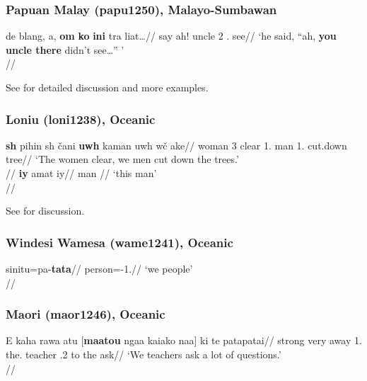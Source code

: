 \documentclass[A4paper]{article}
\begin{document}
\subsubsection{Papuan Malay (papu1250), Malayo-Sumbawan}

\ex
\begingl
\gla de blang, a, \textbf{om} \textbf{ko} \textbf{ini} tra liat\ldots//
\Sg{} say ah! uncle 2\Sg{} \Dem.\Prox{} \Neg{} see//
\glft `he said, ``ah, \textbf{you uncle there} didn't see\ldots'' '\\\citep[353, (66)]{kluge2017}//
\endgl
\xe

See \citet[ch. 6.2]{kluge2017} for detailed discussion and more examples.

\subsubsection{Loniu (loni1238), Oceanic}
	

\pex
\a \begingl
\gla \textbf{s\textepsilon{}h} pihin s\textepsilon{}h \v{c}ani \textbf{uw\textepsilon{}h} kaman uw\textepsilon{}h w\textepsilon{}\v{c}\textepsilon{} ake//
\Pl{} woman 3\Pl{} clear 1\Pl.\Excl{} man 1\Pl.\Excl{} cut.down tree//
\glft `The women clear, we men cut down the trees.'\\\citep[90, (6)]{hamel1994}//
\endgl
\a 
\begingl
\gla \textbf{iy} amat iy\textopeno{}//
\Sg{} man \Dem//
\glft `this man'\\\citep[100, (89)]{hamel1994}//
\endgl
\xe

See \citet[sec. 4.2.1]{hamel1994} for discussion.

\subsubsection{Windesi Wamesa (wame1241), Oceanic}

\ex
\begingl
\gla sinitu=pa-\textbf{tata}//
\glb person=\Det{}-1\Pl{}.\Incl{}//
\glft `we people' \\{\citep[144, (3.46)]{gasser2014}}//
\endgl
\xe

\subsubsection{Maori (maor1246), Oceanic}

\ex 
\begingl
\gla E kaha rawa atu [\textbf{maatou} ngaa  kaiako naa] ki te pata\textperiodcentered{}patai//
\glb \Tam{} strong very away 1\Pl.\Excl{} the.\Pl{} teacher \Dem.2 to the \Redup{}\textperiodcentered{}ask//
\glft `We teachers ask a lot of questions.'\\\citep[373, (1673)]{bauer1993}//
\endgl
\xe
\end{document}
